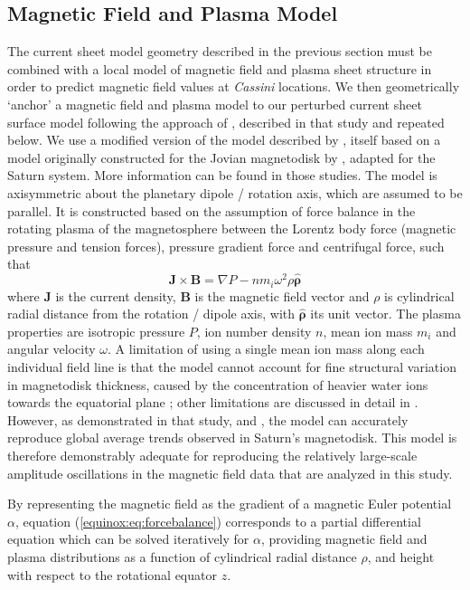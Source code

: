 \subsection{Magnetic Field and Plasma Model}\label{equinox:sec:plasmamodel}
The current sheet model geometry described in the previous section must be combined with a local model of magnetic field and plasma sheet structure in order to predict magnetic field values at \textit{Cassini} locations. We then geometrically `anchor' a magnetic field and plasma model to our perturbed current sheet surface model following the approach of \citet{achilleos2014}, described in that study and repeated below. We use a modified version of the model described by \citet{achilleos2010a}, itself based on a model originally constructed for the Jovian magnetodisk by \citet{caudal1986}, adapted for the Saturn system. More information can be found in those studies. The model is axisymmetric about the planetary dipole / rotation axis, which are assumed to be parallel. It is constructed based on the assumption of force balance in the rotating plasma of the magnetosphere between the Lorentz body force (magnetic pressure and tension forces), pressure gradient force and centrifugal force, such that
\begin{equation}\label{equinox:eq:forcebalance}
\boldsymbol{J} \times \boldsymbol{B} = \nabla P - nm_i\omega^2\rho\boldsymbol{\hat{\rho}}
\end{equation}
where $\boldsymbol{J}$ is the current density, $\boldsymbol{B}$ is the magnetic field vector and $\rho$ is cylindrical radial distance from the rotation / dipole axis, with $\boldsymbol{\hat{\rho}}$ its unit vector. The plasma properties are isotropic pressure $P$, ion number density $n$, mean ion mass $m_i$ and angular velocity $\omega$. A limitation of using a single mean ion mass along each individual field line is that the model cannot account for fine structural variation in magnetodisk thickness, caused by the concentration of heavier water ions towards the equatorial plane \citep[e.g.][]{persoon2009, nemeth2011}; other limitations are discussed in detail in \citet{achilleos2010a}. However, as demonstrated in that study, and \citet{achilleos2010b, sergis2018}, the model can accurately reproduce global average trends observed in Saturn's magnetodisk. This model is therefore demonstrably adequate for reproducing the relatively large-scale amplitude oscillations in the magnetic field data that are analyzed in this study.

By representing the magnetic field as the gradient of a magnetic Euler potential $\alpha$, equation (\ref{equinox:eq:forcebalance}) corresponds to a partial differential equation which can be solved iteratively for $\alpha$, providing magnetic field and plasma distributions as a function of cylindrical radial distance $\rho$, and height with respect to the rotational equator $z$.

